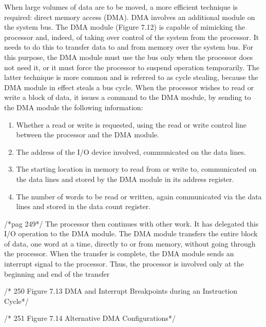 When large volumes of data are to be moved, a more efficient technique is
required: direct memory access (DMA).
DMA involves an additional module on the system bus. The DMA module
(Figure 7.12) is capable of mimicking the processor and, indeed, of taking over control
of the system from the processor. It needs to do this to transfer data to and from
memory over the system bus. For this purpose, the DMA module must use the bus
only when the processor does not need it, or it must force the processor to suspend
operation temporarily. The latter technique is more common and is referred to as
cycle stealing, because the DMA module in effect steals a bus cycle.
When the processor wishes to read or write a block of data, it issues a command
to the DMA module, by sending to the DMA module the following information:
\begin{enumerate}
\item  Whether a read or write is requested, using the read or write control line
between the processor and the DMA module.
\item  The address of the I/O device involved, communicated on the data lines.
\item  The starting location in memory to read from or write to, communicated on
the data lines and stored by the DMA module in its address register.
\item  The number of words to be read or written, again communicated via the data
lines and stored in the data count register.
\end{enumerate}
/*pag 249*/ 
The processor then continues with other work. It has delegated this I/O operation
to the DMA module. The DMA module transfers the entire block of data,
one word at a time, directly to or from memory, without going through the processor.
When the transfer is complete, the DMA module sends an interrupt signal to
the processor. Thus, the processor is involved only at the beginning and end of the
transfer

/*  250 Figure 7.13 DMA and Interrupt Breakpoints during an Instruction Cycle*/

/* 251 Figure 7.14 Alternative DMA Configurations*/

